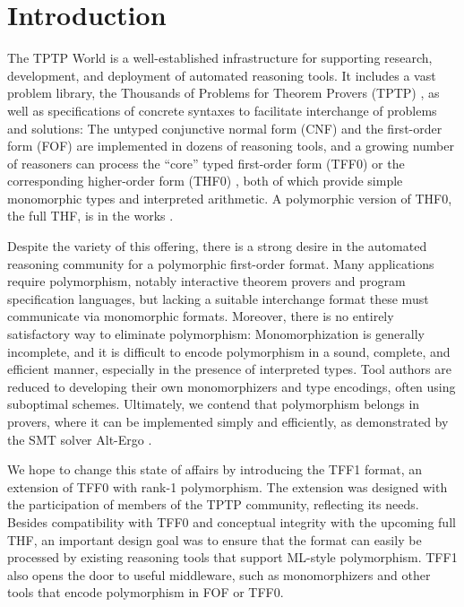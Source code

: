 \section{Introduction}
\label{sec_intro}

The TPTP World \cite{sutcliffe-2010-world} is a well-established infrastructure
for supporting research, development, and deployment of automated reasoning
tools. It includes a vast problem library, the Thousands of Problems for Theorem
Provers (TPTP) \cite{sutcliffe-2009-lib}, as well as specifications of concrete
syntaxes to facilitate interchange of problems and solutions: The untyped
conjunctive normal form (CNF) and the first-order form (FOF) are implemented in
dozens of reasoning tools, and a growing number of reasoners can process the
``core'' typed first-order form (TFF0) \cite{sutcliffe-et-al-2011-tff0} or the
corresponding higher-order form (THF0) \cite{benzmueller-et-al-2008-thf0}, both
of which provide simple monomorphic types and interpreted arithmetic. A
polymorphic version of THF0, the full THF, is in the works
\cite{sutcliffe-benzmueller-2010}.

Despite the variety of this offering, there is a strong desire in the automated
reasoning community for a polymorphic first-order format. Many applications
require polymorphism, notably interactive theorem provers and program
specification languages, but lacking a suitable interchange format these
must communicate via monomorphic formats. Moreover, there is no entirely
satisfactory way to eliminate polymorphism: Monomorphization is generally
incomplete, and it is difficult to encode polymorphism in a sound, complete, and
efficient manner, especially in the presence of interpreted types. Tool authors
are reduced to developing their own monomorphizers and type encodings, often
using suboptimal schemes. Ultimately, we contend that polymorphism belongs in
provers, where it can be implemented simply and efficiently, as demonstrated by
the SMT solver Alt-Ergo \cite{bobot-et-al-2008}.

We hope to change this state of affairs by introducing the TFF1
format, an extension of TFF0 with rank-1 polymorphism. The
extension was designed with the participation of members of the TPTP community,
reflecting its needs.
Besides compatibility with TFF0 and conceptual integrity with the upcoming full
THF, an important design goal was to ensure that the format can easily be
processed by existing reasoning tools that support ML-style polymorphism. TFF1
also opens the door to useful middleware, such as monomorphizers and other
tools that encode polymorphism in FOF or TFF0.

